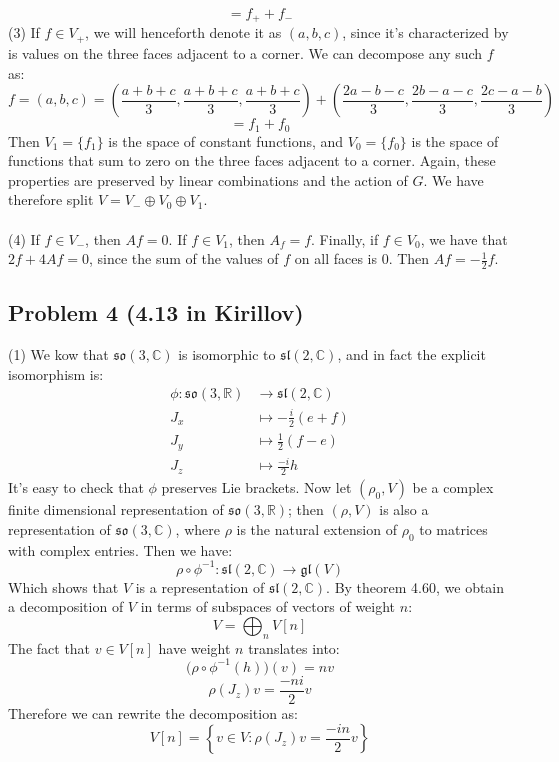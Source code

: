 \documentclass[12 pt]{article}
\newcommand{\R}{\mathbb{R}}
\newcommand{\C}{\mathbb{C}}
\begin{document}
\[   = f_+ + f_-       \]
(3) If $f\in V_+$, we will henceforth denote it as $(a,b,c)$, since it's characterized by is values on the three faces adjacent to a corner. We can decompose any such $f$ as:
\[      f = (a,b,c) = \left( \frac{a+b+c}{3} , \frac{a+b+c}{3} , \frac{a+b+c}{3}  \right)  +  \left( \frac{2a-b-c}{3} , \frac{2b-a-c}{3} , \frac{2c-a-b}{3}  \right)  \]
\[     = f_1 + f_0    \]
Then $V_1 = \{f_1\}$ is the space of constant functions, and $V_0 = \{f_0\}$ is the space of functions that sum to zero on the three faces adjacent to a corner. Again, these properties are preserved by linear combinations and the action of $G$. We have therefore split $V = V_- \oplus V_0 \oplus V_1$.
\\
\\
(4) If $f \in V_-$, then $Af = 0$. If $f \in V_1$, then $A_f = f$. Finally, if $f \in V_0$, we have that $2f + 4Af = 0$, since the sum of the values of $f$ on all faces is 0. Then $Af = -\frac{1}{2} f$.


\subsection*{Problem 4 (4.13 in Kirillov)}
(1) We kow that $\mathfrak{so}(3,\C)$ is isomorphic to $\mathfrak{sl}(2,\C)$, and in fact the explicit isomorphism is:
\begin{align*}
 \phi : \mathfrak{so}(3,\R) &\to \mathfrak{sl}(2,\C)  \\
                          J_x &\mapsto -\frac{i}{2} (e+f)   \\
                          J_y &\mapsto \frac{1}{2} (f-e)   \\
                          J_z &\mapsto \frac{-i}{2} h
\end{align*}
It's easy to check that $\phi$ preserves Lie brackets. Now let $(\rho_0, V)$ be a complex finite dimensional representation of $\mathfrak{so}(3,\R)$; then $(\rho, V)$ is also a representation of $\mathfrak{so}(3,\C)$, where $\rho$ is the natural extension of $\rho_0$ to matrices with complex entries. Then we have:
\[        \rho \circ \phi^{-1} : \mathfrak{sl}(2,\C) \to \mathfrak{gl}(V)       \]
Which shows that $V$ is a representation of $\mathfrak{sl}(2,\C)$. By theorem 4.60, we obtain a decomposition of $V$ in terms of subspaces of vectors of weight $n$:
\[      V = \bigoplus_{n} V[n]       \]
The fact that $v\in V[n]$ have weight $n$ translates into:
\[    \big(  \rho \circ \phi^{-1} (h) \big)(v)  = nv  \]
\[           \rho(J_z) v = \frac{-ni}{2} v           \]
Therefore we can rewrite the decomposition as:
\[       V[n] = \left\{ v \in V : \rho(J_z) v = \frac{-in}{2} v   \right\}    \]
\end{document}

